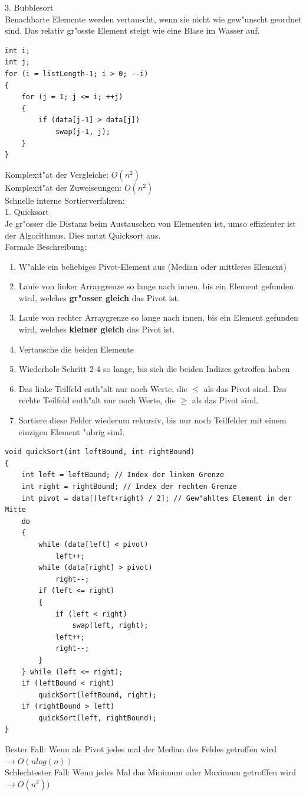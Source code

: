 3. Bubblesort\\
Benachbarte Elemente werden vertauscht, wenn sie nicht wie gew"unscht geordnet sind. Das relativ gr"osste Element steigt wie eine Blase im Wasser auf. 
\begin{lstlisting}[style=C]
int i;
int j;
for (i = listLength-1; i > 0; --i)
{
	for (j = 1; j <= i; ++j)
	{
		if (data[j-1] > data[j])
			swap(j-1, j);
	}
}
\end{lstlisting} 
Komplexit"at der Vergleiche: $O(n^2)$\\
Komplexit"at der Zuweiseungen: $O(n^2)$\\

Schnelle interne Sortierverfahren:\\
1. Quicksort\\
Je gr"osser die Distanz beim Austauschen von Elementen ist, umso effizienter ist der Algorithmus. Dies nutzt Quicksort aus.\\
Formale Beschreibung: \\
\begin{enumerate}
\item W"ahle ein beliebiges Pivot-Element aus (Median oder mittleres Element)
\item Laufe von linker Arraygrenze so lange nach innen, bis ein Element gefunden wird, welches \textbf{gr"osser gleich} das Pivot ist. 
\item Laufe von rechter Arraygrenze so lange nach innen, bis ein Element gefunden wird, welches \textbf{kleiner gleich} das Pivot ist. 
\item Vertausche die beiden Elemente
\item Wiederhole Schritt 2-4 so lange, bis sich die beiden Indizes getroffen haben
\item Das linke Teilfeld enth"alt nur noch Werte, die $\leq$ als das Pivot sind. Das rechte Teilfeld enth"alt nur noch Werte, die $\geq$ als das Pivot sind. 
\item Sortiere diese Felder wiederum rekursiv, bis nur noch Teilfelder mit einem einzigen Element "ubrig sind.
\end{enumerate}

\begin{lstlisting}[style=C]
void quickSort(int leftBound, int rightBound)
{
	int left = leftBound; // Index der linken Grenze
	int right = rightBound; // Index der rechten Grenze
	int pivot = data[(left+right) / 2]; // Gew"ahltes Element in der Mitte
	do
	{
		while (data[left] < pivot)
			left++;
		while (data[right] > pivot)
			right--;
		if (left <= right)
		{
			if (left < right)
				swap(left, right);
			left++;
			right--;
		}
	} while (left <= right);
	if (leftBound < right)
		quickSort(leftBound, right);
	if (rightBound > left)
		quickSort(left, rightBound);
}
\end{lstlisting} 
Bester Fall: Wenn als Pivot jedes mal der Median des Feldes getroffen wird $\rightarrow O(nlog(n))$\\
Schlechtester Fall: Wenn jedes Mal das Minimum oder Maximum getrofffen wird $\rightarrow O(n^2))$\\

